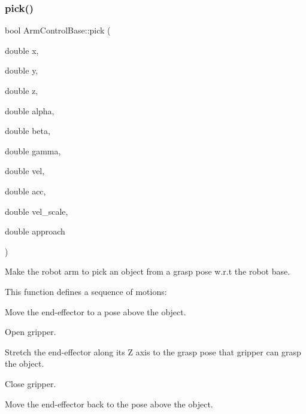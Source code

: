 \subsubsection{\texorpdfstring{pick()}{pick()}\hspace{0.1cm}{\footnotesize\ttfamily [1/2]}}
{\footnotesize\ttfamily bool Arm\+Control\+Base\+::pick (\begin{DoxyParamCaption}\item[{double}]{x,  }\item[{double}]{y,  }\item[{double}]{z,  }\item[{double}]{alpha,  }\item[{double}]{beta,  }\item[{double}]{gamma,  }\item[{double}]{vel,  }\item[{double}]{acc,  }\item[{double}]{vel\+\_\+scale,  }\item[{double}]{approach }\end{DoxyParamCaption})\hspace{0.3cm}{\ttfamily [virtual]}}



Make the robot arm to pick an object from a grasp pose w.\+r.\+t the robot base. 

This function defines a sequence of motions\+:
\begin{DoxyEnumerate}
\item Move the end-\/effector to a pose above the object.
\item Open gripper.
\item Stretch the end-\/effector along its Z axis to the grasp pose that gripper can grasp the object.
\item Close gripper.
\item Move the end-\/effector back to the pose above the object.
\end{DoxyEnumerate}


